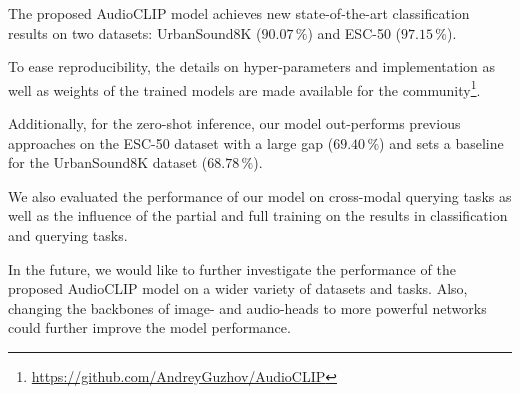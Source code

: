 \documentclass[runningheads]{llncs}
\newif\ifreview
\begin{document}
The proposed \mbox{AudioCLIP} model achieves new state-of-the-art classification results on two datasets: \mbox{UrbanSound8K} ($90.07\,\%$) and \mbox{ESC-50} ($97.15\,\%$).
\ifreview
To ease reproducibility, the details on hyper-parameters and implementation as well as weights of the trained models are made available for the community\footnote[1]{See supplementary materials}.
\else
To ease reproducibility, the details on hyper-parameters and implementation as well as weights of the trained models are made available for the community\footnote[1]{\url{https://github.com/AndreyGuzhov/AudioCLIP}}.
\fi

Additionally, for the zero-shot inference, our model out-performs previous approaches on the \mbox{ESC-50} dataset with a large gap ($69.40\,\%$) and sets a baseline for the \mbox{UrbanSound8K} dataset ($68.78\,\%$).

We also evaluated the performance of our model on cross-modal querying tasks as well as the influence of the partial and full training on the results in classification and querying tasks.

In the future, we would like to further investigate the performance of the proposed \mbox{AudioCLIP} model on a wider variety of datasets and tasks.
Also, changing the backbones of image- and audio-heads to more powerful networks could further improve the model performance.



\end{document}
